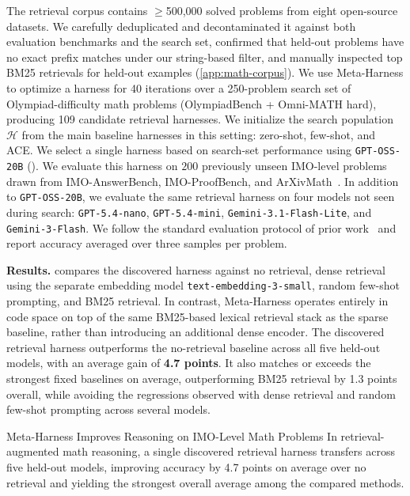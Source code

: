 \documentclass{article}
\begin{document}
The retrieval corpus contains $\geq$500,000 solved problems from eight open-source datasets.
We carefully deduplicated and decontaminated it against both evaluation benchmarks and the search set, confirmed that held-out problems have no exact prefix matches under our string-based filter, and manually inspected top BM25 retrievals for held-out examples (\cref{app:math-corpus}).
We use Meta-Harness to optimize a harness for 40 iterations over a 250-problem search set of Olympiad-difficulty math problems (OlympiadBench + Omni-MATH hard), producing 109 candidate retrieval harnesses.
We initialize the search population $\mathcal{H}$ from the main baseline harnesses in this setting: zero-shot, few-shot, and ACE.
We select a single harness based on search-set performance using \texttt{GPT-OSS-20B} ().
We evaluate this harness on $200$ previously unseen IMO-level problems drawn from IMO-AnswerBench, IMO-ProofBench, and ArXivMath~\citep{imobenchmarks2025,balunovic_srimatharena_2025}.
In addition to \texttt{GPT-OSS-20B}, we evaluate the same retrieval harness on four models not seen during search: \texttt{GPT-5.4-nano}, \texttt{GPT-5.4-mini}, \texttt{Gemini-3.1-Flash-Lite}, and \texttt{Gemini-3-Flash}.
We follow the standard evaluation protocol of prior work~\citep{imobenchmarks2025} and report accuracy averaged over three samples per problem.

\textbf{Results.}
 compares the discovered harness against no retrieval, dense retrieval using the separate embedding model \texttt{text-embedding-3-small}, random few-shot prompting, and BM25 retrieval.
In contrast, Meta-Harness operates entirely in code space on top of the same BM25-based lexical retrieval stack as the sparse baseline, rather than introducing an additional dense encoder.
The discovered retrieval harness outperforms the no-retrieval baseline across all five held-out models, with an average gain of \textbf{4.7 points}.
It also matches or exceeds the strongest fixed baselines on average, outperforming BM25 retrieval by 1.3 points overall, while avoiding the regressions observed with dense retrieval and random few-shot prompting across several models.



\vspace{2mm}
\begin{takeawaybox}{Meta-Harness Improves Reasoning on IMO-Level Math Problems}
In retrieval-augmented math reasoning, a single discovered retrieval harness transfers across five held-out models, improving accuracy by 4.7 points on average over no retrieval and yielding the strongest overall average among the compared methods.
\end{takeawaybox}
\end{document}
